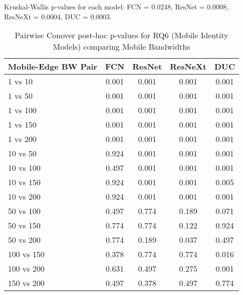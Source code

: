 \begin{table}[h]
\centering
\caption{Pairwise Conover post-hoc p-values for RQ6 (Mobile Identity Models) comparing Mobile Bandwidths}
\label{tab:conover_mobile_identity}
\smallskip
Kruskal-Wallis p-values for each model: FCN = 0.0248, ResNet = 0.0008, ResNeXt = 0.0004, DUC = 0.0003.

\begin{tabular}{lcccc}
\toprule
Mobile-Edge BW Pair & FCN & ResNet & ResNeXt & DUC \\
\midrule
1 vs 10 & 0.001 & 0.001 & 0.001 & 0.001 \\
1 vs 50 & 0.001 & 0.001 & 0.001 & 0.001 \\
1 vs 100 & 0.001 & 0.001 & 0.001 & 0.001 \\
1 vs 150 & 0.001 & 0.001 & 0.001 & 0.001 \\
1 vs 200 & 0.001 & 0.001 & 0.001 & 0.001 \\
10 vs 50 & 0.924 & 0.001 & 0.001 & 0.001 \\
10 vs 100 & 0.497 & 0.001 & 0.001 & 0.001 \\
10 vs 150 & 0.924 & 0.001 & 0.001 & 0.005 \\
10 vs 200 & 0.924 & 0.001 & 0.001 & 0.001 \\
50 vs 100 & 0.497 & 0.774 & 0.189 & 0.071 \\
50 vs 150 & 0.774 & 0.774 & 0.122 & 0.924 \\
50 vs 200 & 0.774 & 0.189 & 0.037 & 0.497 \\
100 vs 150 & 0.378 & 0.774 & 0.774 & 0.016 \\
100 vs 200 & 0.631 & 0.497 & 0.275 & 0.001 \\
150 vs 200 & 0.497 & 0.378 & 0.497 & 0.774 \\
\bottomrule
\end{tabular}
\end{table}
